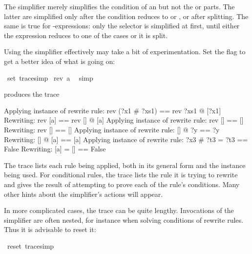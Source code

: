 \begin{isabellebody}
\begin{isamarkuptxt}
\begin{warn}
  The simplifier merely simplifies the condition of an 
   but not the
   or  parts. The latter are simplified only after the
  condition reduces to  or , or after splitting. The
  same is true for -expressions: only the selector is
  simplified at first, until either the expression reduces to one of the
  cases or it is split.
\end{warn}%
\end{isamarkuptxt}%
\isamarkuptrue%
\isamarkupfalse%
%
\isamarkuptrue%
%
\begin{isamarkuptext}%
Using the simplifier effectively may take a bit of experimentation.  Set the
 flag 
to get a better idea of what is going
on:%
\end{isamarkuptext}%
\isamarkuptrue%
\ {\isachardoublequote}set\ trace{\isacharunderscore}simp{\isachardoublequote}\isanewline
\isamarkupfalse%
\ {\isachardoublequote}rev\ {\isacharbrackleft}a{\isacharbrackright}\ {\isacharequal}\ {\isacharbrackleft}{\isacharbrackright}{\isachardoublequote}\isanewline
\isamarkupfalse%
simp{\isacharparenright}\isamarkupfalse%
\isamarkupfalse%
%
\begin{isamarkuptext}%
\noindent
produces the trace

\begin{ttbox}\makeatother
Applying instance of rewrite rule:
rev (?x1 \# ?xs1) == rev ?xs1 @ [?x1]
Rewriting:
rev [a] == rev [] @ [a]
Applying instance of rewrite rule:
rev [] == []
Rewriting:
rev [] == []
Applying instance of rewrite rule:
[] @ ?y == ?y
Rewriting:
[] @ [a] == [a]
Applying instance of rewrite rule:
?x3 \# ?t3 = ?t3 == False
Rewriting:
[a] = [] == False
\end{ttbox}

The trace lists each rule being applied, both in its general form and the 
instance being used.  For conditional rules, the trace lists the rule
it is trying to rewrite and gives the result of attempting to prove
each of the rule's conditions.  Many other hints about the simplifier's
actions will appear.

In more complicated cases, the trace can be quite lengthy.  Invocations of the
simplifier are often nested, for instance when solving conditions of rewrite
rules.  Thus it is advisable to reset it:%
\end{isamarkuptext}%
\isamarkuptrue%
\ {\isachardoublequote}reset\ trace{\isacharunderscore}simp{\isachardoublequote}\isanewline
\isamarkupfalse%
\isamarkupfalse%
\end{isabellebody}%
